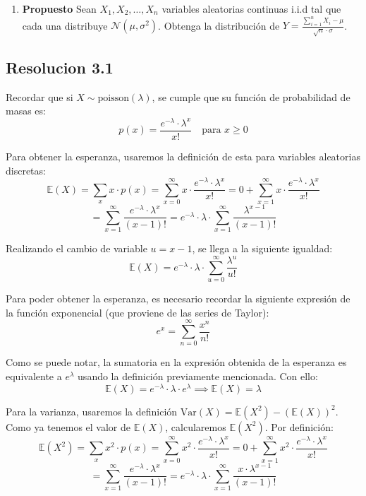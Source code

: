 \documentclass[
  11pt,
  letterpaper,
   addpoints,
   answers
  ]{exam}
\begin{document}
\begin{questions}
\begin{enumerate}
    \item \textbf{Propuesto} Sean \( X_1, X_2, \dots, X_n \) variables aleatorias continuas i.i.d tal que cada una distribuye \( \mathcal{N}(\mu, \sigma^2) \). Obtenga la distribución de \( Y = \frac{\sum_{i=1}^{n} X_i - \mu}{\sqrt{n} \cdot \sigma} \).
\end{enumerate}
\begin{solution}
\subsection*{Resolucion 3.1}
    Recordar que si \( X \sim \text{poisson}(\lambda) \), se cumple que su función de probabilidad de masas es:
\[
p(x) = \frac{e^{-\lambda} \cdot \lambda^x}{x!} \quad \text{para } x \geq 0
\]

Para obtener la esperanza, usaremos la definición de esta para variables aleatorias discretas:
\[
\mathbb{E}(X) = \sum_{x} x \cdot p(x) = \sum_{x=0}^{\infty} x \cdot \frac{e^{-\lambda} \cdot \lambda^x}{x!} = 0 + \sum_{x=1}^{\infty} x \cdot \frac{e^{-\lambda} \cdot \lambda^x}{x!}
\]
\[
= \sum_{x=1}^{\infty} \frac{e^{-\lambda} \cdot \lambda^x}{(x-1)!} = e^{-\lambda} \cdot \lambda \cdot \sum_{x=1}^{\infty} \frac{\lambda^{x-1}}{(x-1)!}
\]

Realizando el cambio de variable \( u = x - 1 \), se llega a la siguiente igualdad:
\[
\mathbb{E}(X) = e^{-\lambda} \cdot \lambda \cdot \sum_{u=0}^{\infty} \frac{\lambda^u}{u!}
\]

Para poder obtener la esperanza, es necesario recordar la siguiente expresión de la función exponencial (que proviene de las series de Taylor):
\[
e^x = \sum_{n=0}^{\infty} \frac{x^n}{n!}
\]

Como se puede notar, la sumatoria en la expresión obtenida de la esperanza es equivalente a \( e^{\lambda} \) usando la definición previamente mencionada. Con ello:
\[
\mathbb{E}(X) = e^{-\lambda} \cdot \lambda \cdot e^{\lambda}
\implies \mathbb{E}(X) = \lambda
\]

Para la varianza, usaremos la definición \( \text{Var}(X) = \mathbb{E}(X^2) - (\mathbb{E}(X))^2 \). Como ya tenemos el valor de \( \mathbb{E}(X) \), calcularemos \( \mathbb{E}(X^2) \).
Por definición:
\[
\mathbb{E}(X^2) = \sum_x x^2 \cdot p(x) = \sum_{x=0}^{\infty} x^2 \cdot \frac{e^{-\lambda} \cdot \lambda^x}{x!} = 0 + \sum_{x=1}^{\infty} x^2 \cdot \frac{e^{-\lambda} \cdot \lambda^x}{x!}
\]
\[
= \sum_{x=1}^{\infty} \frac{e^{-\lambda} \cdot \lambda^x}{(x-1)!} = e^{-\lambda} \cdot \lambda \cdot \sum_{x=1}^{\infty} \frac{x \cdot \lambda^{x-1}}{(x-1)!}
\]


\end{solution}
\end{questions}
\end{document}
